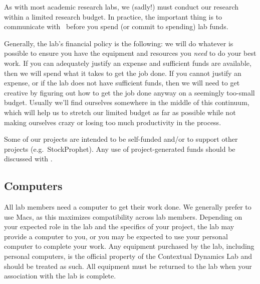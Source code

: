 \documentclass{tufte-book} %
\begin{document}

 \noindent As with most academic research labs, we (sadly!) must
 conduct our research within a limited research budget.  In practice,
 the important thing is to communicate with \director~before you spend
 (or commit to spending) lab funds.

 Generally, the lab's financial policy is the following: we will do
 whatever is possible to ensure you have the equipment and resources
 you \textit{need} to do your best work.  If you can adequately
 justify an expense and sufficient funds are available, then we will
 spend what it takes to get the job done.  If you cannot justify an
 expense, or if the lab does not have sufficient funds, then we will
 need to get creative by figuring out how to get the job done anyway
 on a seemingly too-small budget.  Usually we'll find ourselves
 somewhere in the middle of this continuum, which will help us to
 stretch our limited budget as far as possible while not making
 ourselves crazy or losing too much productivity in the process.

 Some of our projects are intended to be self-funded and/or to support
 other projects (e.g.\ StockProphet).  Any use of project-generated
 funds should be discussed with \director.

 \subsection{Computers}
 All lab members need a computer to get their work done.  We generally
 prefer to use Macs, as this maximizes compatibility across lab
 members.  Depending on your expected role in the lab and the
 specifics of your project, the lab may provide a computer to you, or
 you may be expected to use your personal computer to complete your
 work.  Any equipment purchased by the lab, including personal
 computers, is the official property of the Contextual Dynamics Lab
 and should be treated as such.  All equipment must be returned to the
 lab when your association with the lab is complete.
\end{document}
